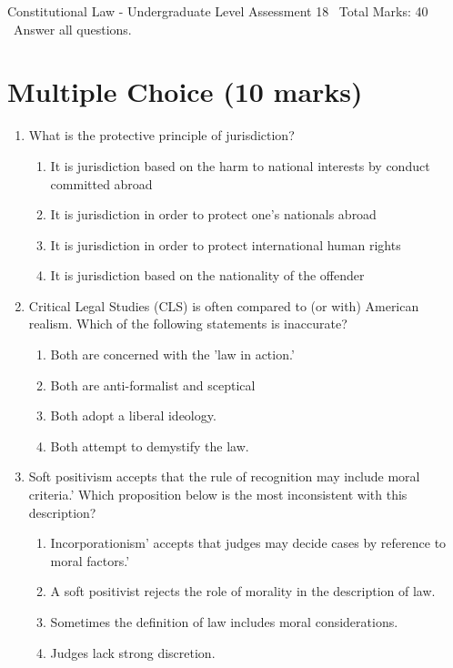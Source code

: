 \documentclass[12pt]{article}
\begin{document}
\begin{center}
Constitutional Law - Undergraduate Level Assessment 18 \
Total Marks: 40 \
Answer all questions.
\end{center}

\section*{Multiple Choice (10 marks)}
\begin{enumerate}[label=\arabic*.]
\item What is the protective principle of jurisdiction?
\begin{enumerate}[label=(\alph*)]
    \item It is jurisdiction based on the harm to national interests by conduct committed abroad
    \item It is jurisdiction in order to protect one's nationals abroad
    \item It is jurisdiction in order to protect international human rights
    \item It is jurisdiction based on the nationality of the offender
\end{enumerate}
\item Critical Legal Studies (CLS) is often compared to (or with) American realism. Which of the following statements is inaccurate?
\begin{enumerate}[label=(\alph*)]
    \item Both are concerned with the 'law in action.'
    \item Both are anti-formalist and sceptical
    \item Both adopt a liberal ideology.
    \item Both attempt to demystify the law.
\end{enumerate}
\item Soft positivism accepts that the rule of recognition may include moral criteria.' Which proposition below is the most inconsistent with this description?
\begin{enumerate}[label=(\alph*)]
    \item Incorporationism' accepts that judges may decide cases by reference to moral factors.'
    \item A soft positivist rejects the role of morality in the description of law.
    \item Sometimes the definition of law includes moral considerations.
    \item Judges lack strong discretion.

\end{enumerate}
\end{enumerate}
\end{document}
